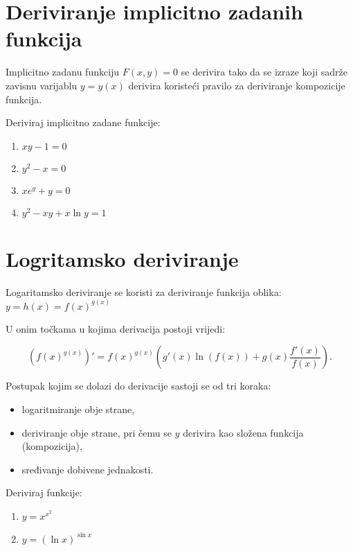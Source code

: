 \section{Deriviranje implicitno zadanih funkcija}

Implicitno zadanu funkciju $F(x,y) = 0$ se derivira tako da se izraze koji sadrže
zavisnu varijablu $y=y(x)$ derivira koristeći pravilo za deriviranje kompozicije
funkcija.

\begin{examplebox}
    Deriviraj implicitno zadane funkcije:

    \begin{enumerate}
        \item $xy-1=0$
        \item $y^2-x=0$
        \item $xe^y+y=0$
        \item $y^2-xy+x\ln y = 1$
    \end{enumerate}
\end{examplebox}

\section{Logritamsko deriviranje}

Logaritamsko deriviranje se koristi za deriviranje funkcija oblika: $\displaystyle
y=h(x)=f(x)^{g(x)}
$

U onim točkama u kojima derivacija postoji vrijedi:

$$
\left(f(x)^{g(x)}\right)' = f(x)^{g(x)}\left(g'(x)\ln(f(x))+g(x)\frac{f'(x)}{f(x)}\right).
$$

Postupak kojim se dolazi do derivacije sastoji se od tri koraka:
\begin{itemize}
    \item logaritmiranje obje strane,
    \item deriviranje obje strane, pri čemu se $y$ derivira kao složena funkcija (kompozicija),
    \item sređivanje dobivene jednakosti.
\end{itemize}

\begin{examplebox}
    Deriviraj funkcije:

    \begin{enumerate}
        \item $y=x^{x^2}$
        \item $y=(\ln x)^{\sin x}$
    \end{enumerate}
\end{examplebox}

